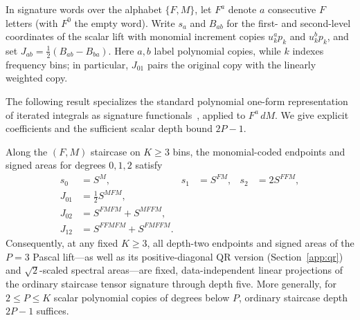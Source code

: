 In signature words over the alphabet \(\{F, M\}\), let \(F^a\) denote \(a\)
consecutive \(F\) letters (with \(F^0\) the empty word). Write \(s_a\) and
\(B_{ab}\) for the first- and second-level coordinates of the scalar lift with
monomial increment copies \(u_k^a p_k\) and \(u_k^b p_k\), and set
\(J_{ab} = \tfrac12(B_{ab} - B_{ba})\). Here \(a,b\) label polynomial copies,
while \(k\) indexes frequency bins; in particular, \(J_{01}\) pairs the original
copy with the linearly weighted copy.

The following result specializes the standard polynomial one-form representation
of iterated integrals as signature functionals~\cite[Lem.~4.1]{polynomialoneforms},
applied to \(F^a\,dM\). We give explicit coefficients and the sufficient scalar
depth bound \(2P-1\).

\begin{theorem}\label{prop:staircase-projection}
Along the \((F, M)\) staircase on \(K \geq 3\) bins, the monomial-coded endpoints
and signed areas for degrees \(0, 1, 2\) satisfy
\begin{align}
 s_0 &= S^M, & s_1 &= S^{FM}, & s_2 &= 2 S^{FFM}, \label{eq:staircase-endpoints}\\
 J_{01} &= \frac{1}{2} S^{MFM}, &&& \label{eq:staircase-area01}\\
 J_{02} &= S^{FMFM} + S^{MFFM}, &&& \label{eq:staircase-area02}\\
 J_{12} &= S^{FFMFM} + S^{FMFFM}. &&& \label{eq:staircase-area12}
\end{align}
Consequently, at any fixed \(K \geq 3\), all depth-two endpoints and signed areas
of the \(P = 3\) Pascal lift---as well as its positive-diagonal QR version
(Section~\ref{app:qr}) and \(\sqrt 2\)-scaled spectral areas---are fixed,
data-independent linear projections of the ordinary staircase tensor signature
through depth five. More generally, for \(2 \leq P \leq K\) scalar polynomial
copies of degrees below \(P\), ordinary staircase depth \(2P - 1\) suffices.
\end{theorem}
